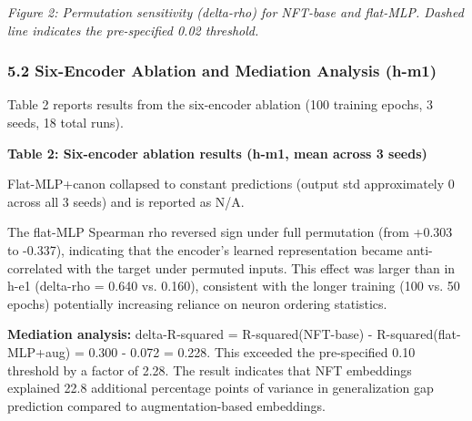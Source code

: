 \textit{Figure 2: Permutation sensitivity (delta-rho) for NFT-base and flat-MLP. Dashed line indicates the pre-specified 0.02 threshold.}

\subsubsection{5.2 Six-Encoder Ablation and Mediation Analysis (h-m1)}

Table 2 reports results from the six-encoder ablation (100 training epochs, 3 seeds, 18 total runs).

\textbf{Table 2: Six-encoder ablation results (h-m1, mean across 3 seeds)}

\begin{table}[htbp]
\centering
{}
\end{table}

Flat-MLP+canon collapsed to constant predictions (output std approximately 0 across all 3 seeds) and is reported as N/A.

The flat-MLP Spearman rho reversed sign under full permutation (from +0.303 to -0.337), indicating that the encoder's learned representation became anti-correlated with the target under permuted inputs. This effect was larger than in h-e1 (delta-rho = 0.640 vs. 0.160), consistent with the longer training (100 vs. 50 epochs) potentially increasing reliance on neuron ordering statistics.

\textbf{Mediation analysis:} delta-R-squared = R-squared(NFT-base) - R-squared(flat-MLP+aug) = 0.300 - 0.072 = 0.228. This exceeded the pre-specified 0.10 threshold by a factor of 2.28. The result indicates that NFT embeddings explained 22.8 additional percentage points of variance in generalization gap prediction compared to augmentation-based embeddings.

